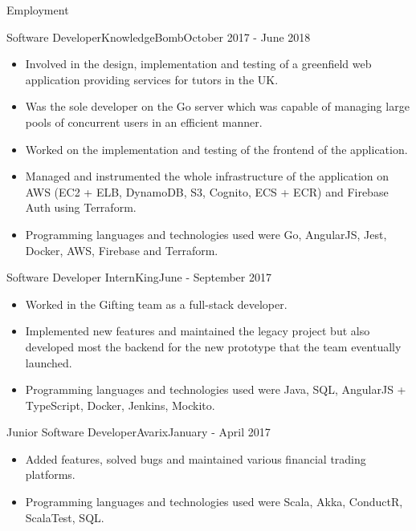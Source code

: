 \documentclass[]{cv}
\begin{document}
\begin{cvsection}{Employment}
		\begin{cvsubsection}{Software Developer}{KnowledgeBomb}{October 2017 - June 2018}	
			\begin{itemize}
				\item Involved in the design, implementation and testing of a greenfield web application 
				providing services for tutors in the UK.
				\item Was the sole developer on the Go server which was capable of managing large pools of concurrent users 
				in an efficient manner.
				\item Worked on the implementation and testing of the frontend of the application.
				\item Managed and instrumented the whole infrastructure of the application on AWS (EC2 + ELB, DynamoDB, S3, Cognito, ECS + ECR)
				and Firebase Auth using Terraform.
				\item Programming languages and technologies used were Go, AngularJS, Jest, Docker, AWS, Firebase and Terraform.
			\end{itemize}
		\end{cvsubsection}
		
		\begin{cvsubsection}{Software Developer Intern}{King}{June - September 2017}
			\begin{itemize}
				\item Worked in the Gifting team as a full-stack developer.
				\item Implemented new features and maintained the legacy project but also developed most the backend for the new prototype that the team eventually launched.
				\item Programming languages and technologies used were Java, SQL, AngularJS + TypeScript, Docker, Jenkins, Mockito.
			\end{itemize}
		\end{cvsubsection}
		
		\begin{cvsubsection}{Junior Software Developer}{Avarix}{January - April 2017}
			\begin{itemize}
				\item Added features, solved bugs and maintained various financial trading platforms.
				\item Programming languages and technologies used were Scala, Akka, ConductR, ScalaTest, SQL.
			\end{itemize}
		\end{cvsubsection}


\end{cvsection}
\end{document}
